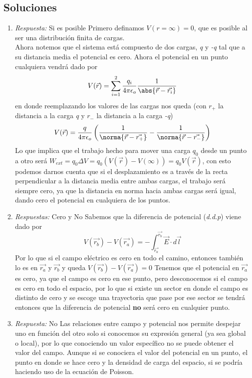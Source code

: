 \subsection{Soluciones}


\begin{enumerate}[label=\alph*)]
    \item \textit{Respuesta:} Si es posible \newline Primero definamos $V(r = \infty)=0$, que es posible al ser una distribución finita de cargas. \\ Ahora notemos que el sistema está compuesto de dos cargas, \textit{q} y \textit{-q} tal que a su distancia media el potencial es cero. Ahora el potencial en un punto cualquiera vendrá dado por \[V(\Vec{r})=\sum_{i=1}^2\frac{q_i}{4\pi\epsilon_o}\frac{1}{\abs{\Vec{r}-\Vec{r_i}}}\] en donde reemplazando los valores de las cargas nos queda (con $r_+$ la distancia a la carga \textit{q} y $r_{-}$ la distancia a la carga \textit{-q}) \[V(\Vec{r})=\frac{q}{4\pi\epsilon_o}\left(\frac{1}{\norma{\Vec{r} - \Vec{r_+}}} - \frac{1}{\norma{\Vec{r} - \Vec{r_{-}}}} \right)\]
    Lo que implica que el trabajo hecho para mover una carga $q_0$ desde un punto a otro será $W_{ext} = q_0 \Delta V = q_0(V(\Vec{r})-V(\infty)) = q_0V(\Vec{r})$, con esto podemos darnos cuenta que si el desplazamiento es a través de la recta perpendicular a la distancia media entre ambas cargas, el trabajo será siempre cero, ya que la distancia en norma hacia ambas cargas será igual, dando cero el potencial en cualquiera de los puntos. 
    
    \item \textit{Respuestas:} Cero y No \newline Sabemos que la diferencia de potencial (\textit{d.d.p}) viene dado por \[V(\Vec{r_b}) - V(\Vec{r_a}) = - \int_{\Vec{r_a}}^{\Vec{r_b}}\Vec{E}\cdot d\Vec{l}\]
    Por lo que si el campo eléctrico es cero en todo el camino, entonces también lo es en $\Vec{r_a}$ y $\Vec{r_b}$ y queda $V(\Vec{r_b}) - V(\Vec{r_a}) = 0$ \newline Tenemos que el potencial en $\Vec{r_a}$ es cero, ya que el campo es cero en ese punto, pero desconocemos si el campo es cero en todo el espacio, por lo que si existe un sector en donde el campo es distinto de cero y se escoge una trayectoria que pase por ese sector se tendrá entonces que la diferencia de potencial \textbf{no} será cero en cualquier punto.
    
    \item \textit{Respuesta:} No \newline Las relaciones entre campo y potencial nos permite despejar uno en función del otro solo si conocemos su expresión general (ya sea global o local), por lo que conociendo un valor específico no se puede obtener el valor del campo. Aunque si se conociera el valor del potencial en un punto, el punto en donde se hace cero y la densidad de carga del espacio, si se podría haciendo uso de la ecuación de Poisson.

\end{enumerate}

